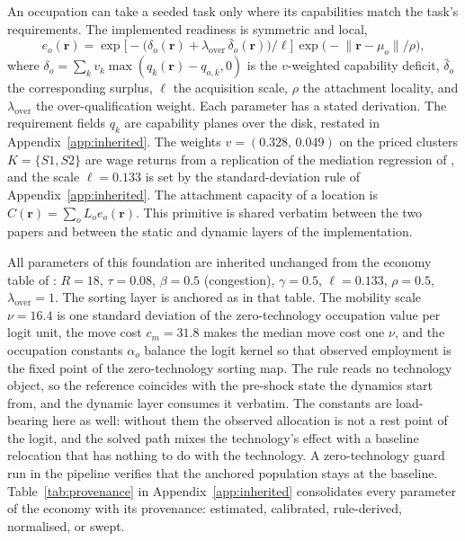 \documentclass[12pt, a4paper]{article}
\newcommand{\rr}{\mathbf{r}}
\begin{document}
An occupation can
take a seeded task only where its capabilities match the task's
requirements. The implemented readiness is symmetric and local,
\begin{equation}
e_o(\rr)
= \exp\!\bigl[-\bigl(\delta_o(\rr)
  + \lambda_{\mathrm{over}}\,\bar\delta_o(\rr)\bigr)/\ell\bigr]\,
  \exp\bigl(-\lVert\rr-\mu_o\rVert/\rho\bigr),
\label{eq:attachment-recap}
\end{equation}
where $\delta_o = \sum_k v_k\max(q_k(\rr) - q_{o,k},0)$ is the $v$-weighted
capability deficit, $\bar\delta_o$ the corresponding surplus,
$\ell$ the acquisition scale, $\rho$ the attachment locality, and
$\lambda_{\mathrm{over}}$ the over-qualification weight. Each parameter
has a stated derivation. The requirement fields $q_k$ are capability
planes over the disk, restated in Appendix~\ref{app:inherited}. The
weights $v = (0.328,\, 0.049)$ on the priced clusters $K = \{S1, S2\}$
are wage returns from a replication of the mediation regression of
\textcite{storck2026geometry}, and the scale $\ell = 0.133$ is set by
the standard-deviation rule of Appendix~\ref{app:inherited}. The attachment
capacity of a location is $C(\rr) = \sum_o L_o e_o(\rr)$. This primitive is
shared verbatim between the two papers and between the static and dynamic
layers of the implementation.

All parameters of this foundation are inherited unchanged from the
economy table of \textcite{storck2026fields}: $R=18$, $\tau=0.08$, $\beta=0.5$
(congestion), $\gamma=0.5$, $\ell=0.133$, $\rho=0.5$,
$\lambda_{\mathrm{over}}=1$. The sorting layer is anchored as in that
table. The mobility scale $\nu = 16.4$ is one standard deviation of the
zero-technology occupation value per logit unit, the move cost
$c_m = 31.8$ makes the median move cost one $\nu$, and the occupation
constants $\alpha_o$ balance the logit kernel so that observed
employment is the fixed point of the zero-technology sorting map. The
rule reads no technology object, so the reference coincides with the
pre-shock state the dynamics start from, and the dynamic layer consumes
it verbatim. The constants are load-bearing here as well: without them
the observed allocation is not a rest point of the logit, and the
solved path mixes the technology's effect with a baseline relocation
that has nothing to do with the technology. A zero-technology guard run
in the pipeline verifies that the anchored population stays at the
baseline.
Table~\ref{tab:provenance} in Appendix~\ref{app:inherited} consolidates
every parameter of the economy with its provenance: estimated,
calibrated, rule-derived, normalised, or swept.
\end{document}
